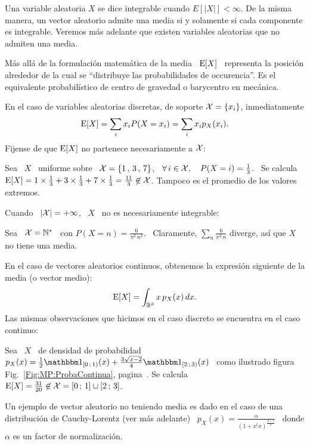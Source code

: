 Una variable  aleatoria $X$ se dice  integrable cuando $E[|X|] <  \infty$. De la
misma  manera, un  vector aleatorio  admite  una media  si y  solamente si  cada
componente  es   integrable.  Veremos  m\'as  adelante   que  existen  variables
aleatorias que no admiten una media.

M\'as  all\'a  de  la formulaci\'on  matem\'atica  de  la  media \  $\operatorname{E}[X]$  \
representa la posici\'on alrededor de la cual se ``distribuye las probabilidades
de  occurencia''. Es  el equivalente  probabil\'istico de  centro de  gravedad o
barycentro en mec\'anica.

En  el caso de  variables aleatorias  discretas, de  soporte $\mathcal{X}  = \{  x_i \}$,
inmediatamente
%
\[
\operatorname{E}[X] = \sum_i x_i P(X = x_i) = \sum_i x_i p_X(x_i).
\]
%
\noindent  Fijense de  que $\operatorname{E}[X]$  no partenece  necesariamente a  $\mathcal{X}$:
%
\begin{ejemplo}
\label{Ej:MP:Uniforme3Estados}
%
  Sea \  $X$ \  uniforme sobre \  $\mathcal{X} = \{  1 \,  , \, 3  \, ,  \, 7 \}$,  \ie \
  $\forall \,  i \in \mathcal{X}, \quad  P(X = i) =  \frac13$. \ Se calcula  $\operatorname{E}[X] = 1
  \times \frac13  + 3 \times \frac13  + 7 \times \frac13  = \frac{11}{3} \not\in
  \mathcal{X}$.  Tampoco es el promedio de los valores extremos.
\end{ejemplo}
%
\noindent Cuando \ $|\mathcal{X}| = +\infty$, \ $X$ \ no es necesariamente integrable:
%
\begin{ejemplo}
\label{Ej:MP:DiscretaSinMedia}
%
  Sea \ $\mathcal{X} = \mathbb{N}^*$ \ con  $P(X = n) = \frac{6}{\pi^2 \, n^2}$. \ Claramente,
  $\sum_n\frac{6}{\pi^2 \, n}$ diverge, as\'i que $X$ no tiene una media.
\end{ejemplo}

En el caso de vectores  aleatorios continuos, obtenemos la expresi\'on siguiente
de la media (o vector medio):
%
\[
\operatorname{E}[X] = \int_{\mathbb{R}^d} x \, p_X(x) \, dx.
\]
%
\noindent Las mismas observaciones que  hicimos en el caso discreto se encuentra
en el caso continuo:
%
\begin{ejemplo}
\label{Ej:MP:MediaNoEnX}
%
Sea \ $X$ \ de densidad de  probabilidad \ $p_X(x) = \frac12 \un_{[0 \; 1)}(x) +
\frac{3   \sqrt{x-2}}{4}   \un_{[2   \;   3)}(x)$  \   como   ilustrado   figura
Fig.~\ref{Fig:MP:ProbaContinua},    pagina~\pageref{Fig:MP:ProbaContinua}.    Se
calcula \ $\operatorname{E}[X] = \frac{31}{20} \not\in \mathcal{X} = [0 \, ; \, 1] \cup [2 \, ; \, 3]$.
\end{ejemplo}
%
\begin{ejemplo}
\label{Ej:MP:VariableCauchySinMedia}
%
  Un ejemplo  de vector aleatorio no  teniendo media es  dado en el caso  de una
  distribuci\'on de Cauchy-Lorentz (ver  m\'as adelante) \ $\displaystyle p_X(x)
  = \frac{\alpha}{\left( 1 + x^t x \right)^{\frac{d+1}{2}}}$ \ donde $\alpha$ es
  un factor de normalizaci\'on.
\end{ejemplo}


